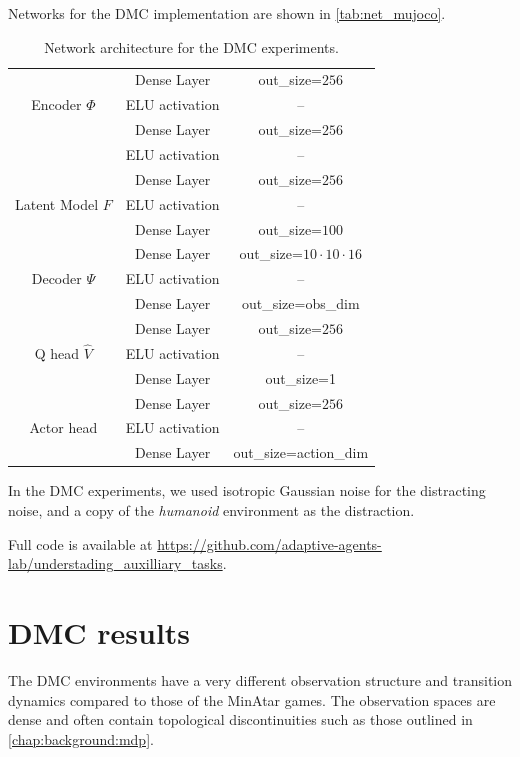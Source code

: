 Networks for the DMC implementation are shown in \autoref{tab:net_mujoco}.

\begin{table}
\begin{center}
\begin{tabular}{c|c|c}
     & Dense Layer & out\_size=$256$ \\
     Encoder $\Phi$ & ELU activation & -- \\
     & Dense Layer & out\_size=$256$\\
     & ELU activation & -- \\\hline
     & Dense Layer & out\_size=$256$ \\
     Latent Model $F$ & ELU activation & -- \\
     & Dense Layer & out\_size=$100$\\\hline
     & Dense Layer & out\_size=$10\cdot10\cdot16$\\
     Decoder $\Psi$ & ELU activation & -- \\
     & Dense Layer & out\_size=obs\_dim\\\hline
     & Dense Layer & out\_size=$256$ \\
     Q head $\hat{V}$ & ELU activation & --\\
     & Dense Layer & out\_size=1\\\hline
     & Dense Layer & out\_size=$256$ \\
     Actor head & ELU activation & --\\
     & Dense Layer & out\_size=action\_dim
\end{tabular}
\end{center}
\caption{Network architecture for the DMC experiments.}
\label{tab:net_mujoco}
\end{table}
In the DMC experiments, we used isotropic Gaussian noise for the distracting noise, and a copy of the \emph{humanoid} environment as the distraction.

Full code is available at \url{https://github.com/adaptive-agents-lab/understading_auxilliary_tasks}.


\section{DMC results}
\label{app:understanding:mujoco_results}

The DMC environments have a very different observation structure and transition dynamics compared to those of the MinAtar games. The observation spaces are dense and often contain topological discontinuities such as those outlined in \autoref{chap:background:mdp}.

